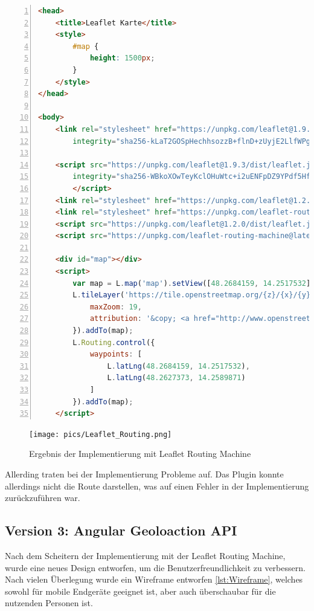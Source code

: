 \begin{lstlisting}[numbers=left,language=HTML,caption={Implementierung einer Karte mit Leaflet Routing Engine},label={lst:leafletmap}]
    <head>
    <title>Leaflet Karte</title>
    <style>
        #map {
            height: 1500px;
        }
    </style>
</head>

<body>
    <link rel="stylesheet" href="https://unpkg.com/leaflet@1.9.3/dist/leaflet.css"
        integrity="sha256-kLaT2GOSpHechhsozzB+flnD+zUyjE2LlfWPgU04xyI=" crossorigin="" />

    <script src="https://unpkg.com/leaflet@1.9.3/dist/leaflet.js"
        integrity="sha256-WBkoXOwTeyKclOHuWtc+i2uENFpDZ9YPdf5Hf+D7ewM=" crossorigin="">
        </script>
    <link rel="stylesheet" href="https://unpkg.com/leaflet@1.2.0/dist/leaflet.css" />
    <link rel="stylesheet" href="https://unpkg.com/leaflet-routing-machine@latest/dist/leaflet-routing-machine.css" />
    <script src="https://unpkg.com/leaflet@1.2.0/dist/leaflet.js"></script>
    <script src="https://unpkg.com/leaflet-routing-machine@latest/dist/leaflet-routing-machine.js"></script>

    <div id="map"></div>
    <script>
        var map = L.map('map').setView([48.2684159, 14.2517532], 15);
        L.tileLayer('https://tile.openstreetmap.org/{z}/{x}/{y}.png', {
            maxZoom: 19,
            attribution: '&copy; <a href="http://www.openstreetmap.org/copyright">OpenStreetMap</a>'
        }).addTo(map);
        L.Routing.control({
            waypoints: [
                L.latLng(48.2684159, 14.2517532),
                L.latLng(48.2627373, 14.2589871)
            ]
        }).addTo(map);
    </script>
\end{lstlisting}
\begin{figure}[h]
    \centering
    \texttt{[image: pics/Leaflet\_Routing.png]}
    \caption{Ergebnis der Implementierung mit Leaflet Routing Machine}
\end{figure}

Allerding traten bei der Implementierung Probleme auf. Das Plugin konnte allerdings nicht die Route darstellen, was auf einen Fehler in der Implementierung zurückzuführen war.

\subsection{Version 3: Angular Geoloaction API}
Nach dem Scheitern der Implementierung mit der Leaflet Routing Machine, wurde eine neues Design entworfen, um die Benutzerfreundlichkeit zu verbessern.
Nach vielen Überlegung wurde ein Wireframe entworfen \ref{lst:Wireframe}, welches sowohl für mobile Endgeräte geeignet ist, aber auch überschaubar für die nutzenden Personen ist.

